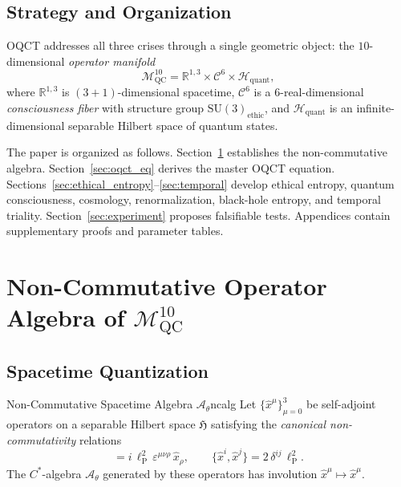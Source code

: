 \documentclass[12pt,a4paper]{article}
\theoremstyle{myrmk}
\newcommand{\Mmanifold}{\mathcal{M}^{10}_{\mathrm{QC}}}
\newcommand{\lP}{\ell_{\mathrm{P}}}
\newcommand{\cC}{\mathcal{C}^{6}}
\newcommand{\HH}{\mathcal{H}_{\mathrm{quant}}}
\begin{document}
\subsection{Strategy and Organization}

OQCT addresses all three crises through a single geometric object: the
$10$-dimensional \emph{operator manifold}
\begin{equation}
  \Mmanifold = \mathbb{R}^{1,3} \times \cC \times \HH,
  \label{eq:manifold_def}
\end{equation}
where $\mathbb{R}^{1,3}$ is $(3{+}1)$-dimensional spacetime, $\cC$ is a
$6$-real-dimensional \emph{consciousness fiber} with structure group
$\mathrm{SU}(3)_{\mathrm{ethic}}$, and $\HH$ is an infinite-dimensional separable
Hilbert space of quantum states.

The paper is organized as follows. Section~\ref{sec:algebra} establishes the
non-commutative algebra. Section~\ref{sec:oqct_eq} derives the master OQCT equation.
Sections~\ref{sec:ethical_entropy}--\ref{sec:temporal} develop ethical entropy,
quantum consciousness, cosmology, renormalization, black-hole entropy, and temporal
triality. Section~\ref{sec:experiment} proposes falsifiable tests.
Appendices contain supplementary proofs and parameter tables.

\section{Non-Commutative Operator Algebra of \texorpdfstring{$\Mmanifold$}{M10QC}}
\label{sec:algebra}

\subsection{Spacetime Quantization}

\begin{definition}{Non-Commutative Spacetime Algebra $\mathcal{A}_\theta$}{ncalg}
Let $\{\hat{x}^\mu\}_{\mu=0}^{3}$ be self-adjoint operators on a separable Hilbert
space $\mathfrak{H}$ satisfying the \emph{canonical non-commutativity} relations
\begin{equation}
  [\hat{x}^\mu, \hat{x}^\nu] = i\,\lP^2\,\varepsilon^{\mu\nu\rho}\,\hat{x}_\rho,
  \qquad
  \{\hat{x}^i, \hat{x}^j\} = 2\,\delta^{ij}\,\lP^2.
  \label{eq:nc_algebra}
\end{equation}
The $C^*$-algebra $\mathcal{A}_\theta$ generated by these operators has involution
$\hat{x}^\mu\mapsto\hat{x}^\mu$.
\end{definition}
\end{document}

